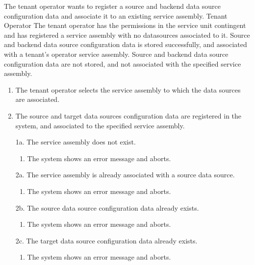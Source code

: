 \pagebreak
{}
{The tenant operator wants to register a source and backend data source configuration data and associate it to an existing service assembly.}
{Tenant Operator}
{The tenant operator has the permissions in the service unit contingent and has registered a service assembly with no datasources associated to it.}
{Source and backend data source configuration data is stored successfully, and associated with a tenant's operator service assembly.}
{Source and backend data source configuration data are not stored, and not associated with the specified service assembly.}
{\begin{enumerate}
	\item The tenant operator selects the service assembly to which the data sources are associated.
	\item The source and target data sources configuration data are registered in the system, and associated to the specified service assembly.
\end{enumerate}}
{\begin{enumerate}
	\item[1a.] The service assembly does not exist.
		\begin{enumerate}
			\item The system shows an error message and aborts.
		\end{enumerate}
	\item[2a.] The service assembly is already associated with a source data source.
		\begin{enumerate}
			\item The system shows an error message and aborts.
		\end{enumerate}
	\item[2b.] The source data source configuration data already exists.
		\begin{enumerate}
			\item The system shows an error message and aborts.
		\end{enumerate}
	\item[2c.] The target data source configuration data already exists.
		\begin{enumerate}
			\item The system shows an error message and aborts.
		\end{enumerate}
\end{enumerate}}

